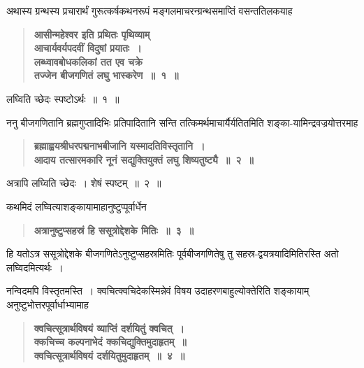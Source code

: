 \documentclass[11pt, openany]{book}
\begin{document}
\begin{sloppypar}
{\small अथास्य ग्रन्थस्य प्रचारार्थं गुरूत्कर्षकथनरूपं मङ्गलमाचरन्ग्रन्थसमाप्तिं वसन्ततिलकयाह\textendash }

 \label{12.1}
\begin{quote}
{\large \textbf{{\color{purple}आसीन्महेश्वर इति प्रथितः पृथिव्याम् \\
आचार्यवर्यपदवीं विदुषां प्रयातः~।\\
लब्ध्वावबोधकलिकां तत एव चक्रे\\
तज्जेन बीजगणितं लघु भास्करेण~॥~१~॥}}}
\end{quote}

लघ्विति च्छेदः स्पष्टोऽर्थः~॥~१~॥ 
\vspace{2mm}

{\small ननु बीजगणितानि ब्रह्मगुप्तादिभिः प्रतिपादितानि सन्ति तत्किमर्थमाचार्यैर्यतितमिति शङ्का-यामिन्द्रवज्रयोत्तरमाह\textendash }

 \label{12.2}
\begin{quote}
{\large \textbf{{\color{purple}ब्रह्माह्वयश्रीधरपद्मनाभबीजानि यस्मादतिविस्तृतानि~।\\
आदाय तत्सारमकारि नूनं सद्युक्तियुक्तं लघु शिष्यतुष्ट्यै~॥~२~॥}}}
\end{quote}

अत्रापि लघ्विति च्छेदः~। शेषं स्पष्टम्~॥~२~॥
\vspace{2mm}

{\small कथमिदं लघ्वित्याशङ्कायामाहानुष्टुप्पूर्वार्धेन\textendash }

 \label{12.3}
\begin{quote}
{\large \textbf{{\color{purple}अत्रानुष्टुप्सहस्रं हि ससूत्रोद्देशके मितिः~॥~३~॥}}}
\end{quote}

हि यतोऽत्र ससूत्रोद्देशके बीजगणितेऽनुष्टुप्सहस्रमितिः पूर्वबीजगणितेषु तु सहस्र-द्वयत्रयादिमितिरस्ति अतो लघ्विदमित्यर्थः~। 
\vspace{2mm}

{\small नन्विदमपि विस्तृतमस्ति~। क्वचित्क्वचिदेकस्मिन्नेवं विषय उदाहरणबाहुल्योक्तेरिति शङ्कायाम् अनुष्टुभोत्तरपूर्वार्धाभ्यामाह\textendash }

 \label{12.4}
\begin{quote}
{\large \textbf{{\color{purple}क्वचित्सूत्रार्थविषयं व्याप्तिं दर्शयितुं क्वचित्~।\\
क्कचिच्च कल्पनाभेदं क्कचिद्युक्तिमुदाहृतम्~॥\\
क्वचित्सूत्रार्थविषयं दर्शयितुमुदाहृतम्~॥~४~॥}}}
\end{quote}


\end{sloppypar}
\end{document}
